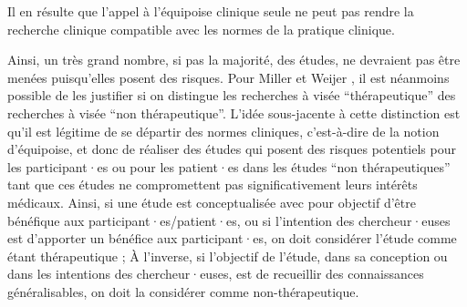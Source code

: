 \documentclass[
  12pt,
]{book}
\begin{document}
Il en résulte que l'appel à l'équipoise clinique seule ne peut pas rendre la recherche clinique compatible avec les normes de la pratique clinique.

Ainsi, un très grand nombre, si pas la majorité, des études, ne devraient pas être menées puisqu'elles posent des risques. Pour Miller et Weijer \citeyearpar{Miller2006}, il est néanmoins possible de les justifier si on distingue les recherches à visée ``thérapeutique'' des recherches à visée ``non thérapeutique''. L'idée sous-jacente à cette distinction est qu'il est légitime de se départir des normes cliniques, c'est-à-dire de la notion d'équipoise, et donc de réaliser des études qui posent des risques potentiels pour les participant·es ou pour les patient·es dans les études ``non thérapeutiques'' tant que ces études ne compromettent pas significativement leurs intérêts médicaux. Ainsi, si une étude est conceptualisée avec pour objectif d'être bénéfique aux participant·es/patient·es, ou si l'intention des chercheur·euses est d'apporter un bénéfice aux participant·es, on doit considérer l'étude comme étant thérapeutique ; À l'inverse, si l'objectif de l'étude, dans sa conception ou dans les intentions des chercheur·euses, est de recueillir des connaissances généralisables, on doit la considérer comme non-thérapeutique.
\end{document}
